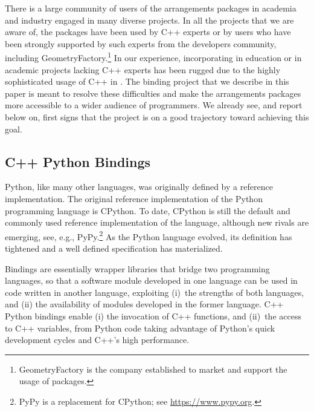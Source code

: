 There is a large community of users of the \cgal{} arrangements packages in academia and industry engaged in many diverse projects. 
In all the projects that we are aware of, the packages have been used by C++ experts or by users who have been strongly supported by such experts from the \cgal{} developers community, including GeometryFactory.\footnote{GeometryFactory is the company established to market and support the usage of \cgal{} packages.} 
In our experience, incorporating \cgal{} in education or in academic projects lacking C++ experts has been rugged due to the highly sophisticated usage of C++ in \cgal.
The binding project that we describe in this paper is meant to resolve these difficulties and make the arrangements packages more accessible to a wider audience of programmers. We already see, and report below on, first signs that the project is on a good trajectory toward achieving this goal.

\subsection{C++ Python Bindings}
\label{ssec:intro:bind}
Python, like many other languages, was originally defined by a reference implementation. The original reference implementation of the Python programming language is CPython. To date, CPython is still the default and commonly used reference implementation of the language, although new rivals are emerging, see, e.g., PyPy.\footnote{PyPy is a replacement for CPython; see \url{https://www.pypy.org}.} As the Python language evolved, its definition has tightened and a well defined specification has materialized.

Bindings are essentially wrapper libraries that bridge two programming languages, so that a software module developed in one language can be used in code written in another language, exploiting (i)~the strengths of both languages, and (ii) the availability of modules developed in the former language. C++ Python bindings enable (i) the invocation of C++ functions, and (ii)~the access to C++ variables, from Python code taking advantage of Python's quick development cycles and C++'s high performance.

